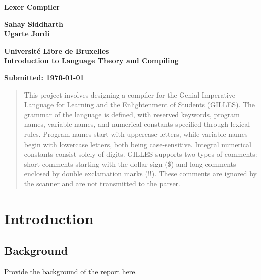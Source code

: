 \documentclass[12pt,a4paper]{report}
\begin{document}
	
	\begin{titlepage}
		\centering
		\vspace*{2cm}
		
		\Huge
		\textbf{Lexer Compiler}
		
		\vspace{1.5cm}
		
		\Large
		\textbf{Sahay Siddharth} \\
		\textbf{Ugarte Jordi}		
		
		\vfill
		
		\Large
		\textbf{Université Libre de Bruxelles} \\
		\textbf{Introduction to Language Theory and Compiling}
		
		\vspace{0.8cm}
		
		\large
		\textbf{Submitted: \today}
		
		\vfill
	\end{titlepage}
	
	\begin{abstract}
		This project involves designing a compiler for the Genial Imperative Language for Learning and the Enlightenment of Students (GILLES). The grammar of the language is defined, with reserved keywords, program names, variable names, and numerical constants specified through lexical rules. Program names start with uppercase letters, while variable names begin with lowercase letters, both being case-sensitive. Integral numerical constants consist solely of digits. GILLES supports two types of comments: short comments starting with the dollar sign (\$) and long comments enclosed by double exclamation marks (!!). These comments are ignored by the scanner and are not transmitted to the parser.
	\end{abstract}

	
	\tableofcontents
	\newpage
	
	\listoffigures
	\newpage
	
	\listoftables
	\newpage
	
	\chapter{Introduction}
	\section{Background}
	Provide the background of the report here.
\end{document}
